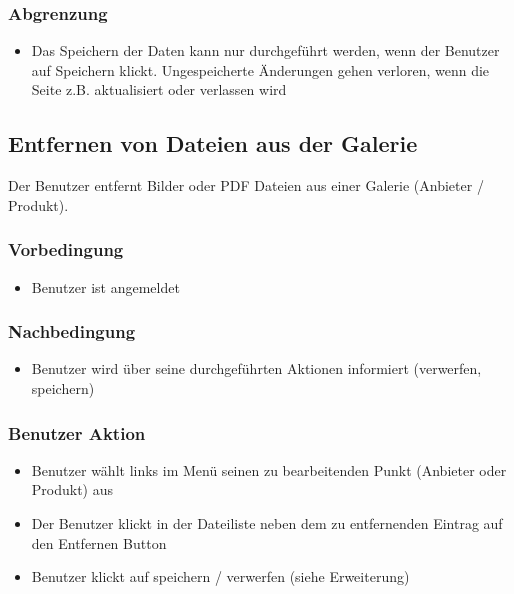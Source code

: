 \documentclass[a4paper,12pt]{article}
\begin{document}
\subsubsection{Abgrenzung}\label{abgrenzung-6}

\begin{itemize}

\item
  Das Speichern der Daten kann nur durchgeführt werden, wenn der
  Benutzer auf Speichern klickt. Ungespeicherte Änderungen gehen
  verloren, wenn die Seite z.B. aktualisiert oder verlassen wird
\end{itemize}

\clearpage

\subsection{Entfernen von Dateien aus der Galerie}\label{benutzer-entfernt-bilderpdf-aus-einer-galerie-anbieter-produkt}
Der Benutzer entfernt Bilder oder PDF Dateien aus einer Galerie (Anbieter / Produkt).

\subsubsection{Vorbedingung}\label{vorbedingung-7}

\begin{itemize}

\item
  Benutzer ist angemeldet
\end{itemize}

\subsubsection{Nachbedingung}\label{nachbedingung-7}

\begin{itemize}

\item
  Benutzer wird über seine durchgeführten Aktionen informiert
  (verwerfen, speichern)
\end{itemize}

\subsubsection{Benutzer Aktion}\label{benutzer-aktion-7}

\begin{itemize}

\item
  Benutzer wählt links im Menü seinen zu bearbeitenden Punkt (Anbieter
  oder Produkt) aus
\item
  Der Benutzer klickt in der Dateiliste neben dem zu entfernenden
  Eintrag auf den Entfernen Button
\item
  Benutzer klickt auf speichern / verwerfen (siehe Erweiterung)
\end{itemize}
\end{document}
